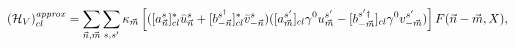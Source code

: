 \begin{equation}
\label{hamiltonianVaprox}
({\cal H}_V)^{\it{approx}}_{cl} =
\sum_{{\vec n},{\vec m}} 
\sum_{s,s'} \kappa_{\vec m} 
\left[([a^{s}_{\vec n}]^*_{cl} \bar{u}^s_{\vec n} +
[b^{s^{\dagger}}_{-{\vec n}}]^*_{cl} \bar{v}^s_{-{\vec n}})
([a^{s'}_{\vec m}]_{cl} \gamma^0 u^{s'}_{\vec m} -
[b^{s'\dagger}_{-{\vec m}}]_{cl} \gamma^0 v^{s'}_{-{\vec m}})\right]
F({\vec n}-{\vec m},X),
\end{equation}

